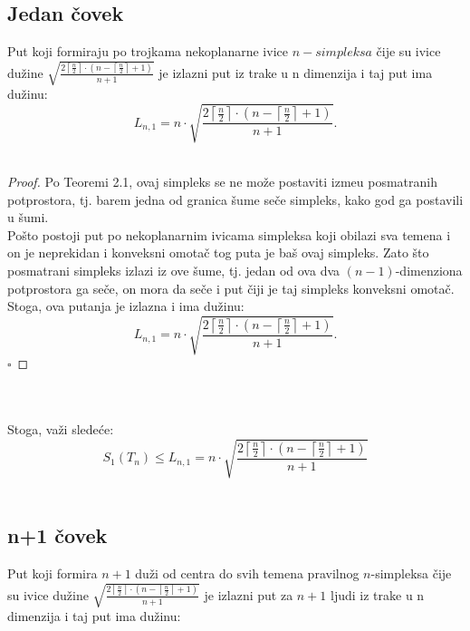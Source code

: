 \documentclass[11pt,letter]{article}
\begin{document}
\subsection[Jedan \v covek]{Jedan \v covek}
\bigskip
\teo Put koji formiraju po trojkama nekoplanarne ivice $n-simpleksa$ \v cije su ivice du\v zine $\sqrt{\frac{2\left\lceil \frac{n}{2}\right\rceil\cdot \left( n-\left\lceil\frac{n}{2}\right\rceil+1\right)}{n+1}}$ je izlazni put iz trake u n dimenzija i taj put ima du\v zinu:
$$L_{n,1}=n\cdot \sqrt{\frac{2\left\lceil \frac{n}{2}\right\rceil\cdot \left( n-\left\lceil\frac{n}{2}\right\rceil+1\right)}{n+1}}.$$
\\
\smallskip
\begin{proof}
Po Teoremi 2.1, ovaj simpleks se ne mo\v ze postaviti izme\dj u posmatranih potprostora, tj. barem jedna od granica \v sume se\v ce simpleks, kako god ga postavili u \v sumi.
\\
\indent Po\v sto postoji put po nekoplanarnim ivicama simpleksa koji obilazi sva temena i on je neprekidan i konveksni omota\v c tog puta je ba\v s ovaj simpleks. Zato \v sto posmatrani simpleks izlazi iz ove \v sume, tj. jedan od ova dva $(n-1)$-dimenziona potprostora ga se\v ce, on mora da se\v ce i put \v ciji je taj simpleks konveksni omota\v c. Stoga, ova putanja je izlazna i ima du\v zinu:
$$L_{n,1}=n\cdot \sqrt{\frac{2\left\lceil \frac{n}{2}\right\rceil\cdot \left( n-\left\lceil\frac{n}{2}\right\rceil+1\right)}{n+1}}.$$
$\square$
\end{proof}
\\
\\
Stoga, va\v zi slede\' ce:
$$S_1(T_n)\leqslant L_{n, 1}=n\cdot \sqrt{\frac{2\left\lceil \frac{n}{2}\right\rceil\cdot \left( n-\left\lceil\frac{n}{2}\right\rceil+1\right)}{n+1}}$$
\\
\smallskip
\subsection[n+1 \v covek]{n+1 \v covek} 
\bigskip
\teo Put koji formira $n+1$ du\v zi od centra do svih temena pravilnog $n$-simpleksa  \v cije su ivice du\v zine $\sqrt{\frac{2\left\lceil \frac{n}{2}\right\rceil\cdot \left( n-\left\lceil\frac{n}{2}\right\rceil+1\right)}{n+1}}$ je izlazni put za $n+1$ ljudi iz trake u n dimenzija i taj put ima du\v zinu:
\end{document}
